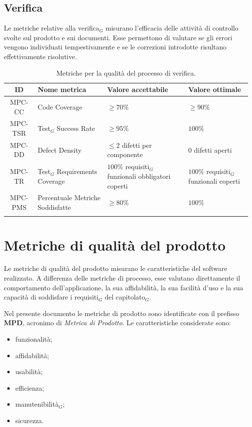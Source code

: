 \documentclass[a4paper, 10pt, colorlinks=true, linkcolor=black, urlcolor=blue, citecolor=blue, hidelinks]{article}
\begin{document}
\subsection{Verifica}

Le metriche relative alla verifica$_G$ misurano l'efficacia delle attività di controllo svolte sul prodotto e sui documenti. Esse permettono di valutare se gli errori vengono individuati tempestivamente e se le correzioni introdotte risultano effettivamente risolutive.

\begingroup
\small
\renewcommand{\arraystretch}{1.25}
\begin{longtable}{|c|p{4cm}|p{3cm}|p{3cm}|}
    \hline
    \textbf{ID} & \textbf{Nome metrica} & \textbf{Valore accettabile} & \textbf{Valore ottimale} \\
    \hline
    \endhead

    MPC-CC & Code Coverage & $\geq 70\%$ & $\geq 90\%$ \\ \hline
    MPC-TSR & Test$_G$ Success Rate & $\geq 95\%$ & $100\%$ \\ \hline
    MPC-DD & Defect Density & $\leq 2$ difetti per componente & $0$ difetti aperti \\ \hline
    MPC-TR & Test$_G$ Requirements Coverage & $100\%$ requisiti$_G$ funzionali obbligatori coperti & $100\%$ requisiti$_G$ funzionali coperti \\ \hline
    MPC-PMS & Percentuale Metriche Soddisfatte & $\geq 80\%$ & $100\%$ \\ \hline

    \caption{Metriche per la qualità del processo di verifica.}
    \label{tab:metriche-verifica}
\end{longtable}
\endgroup

\section{Metriche di qualità del prodotto}

Le metriche di qualità del prodotto misurano le caratteristiche del software realizzato. A differenza delle metriche di processo, esse valutano direttamente il comportamento dell'applicazione, la sua affidabilità, la sua facilità d'uso e la sua capacità di soddisfare i requisiti$_G$ del capitolato$_G$.

Nel presente documento le metriche di prodotto sono identificate con il prefisso \textbf{MPD}, acronimo di \textit{Metrica di Prodotto}. Le caratteristiche considerate sono:
\begin{itemize}
    \item funzionalità;
    \item affidabilità;
    \item usabilità;
    \item efficienza;
    \item manutenibilità$_G$;
    \item sicurezza.
\end{itemize}
\end{document}
